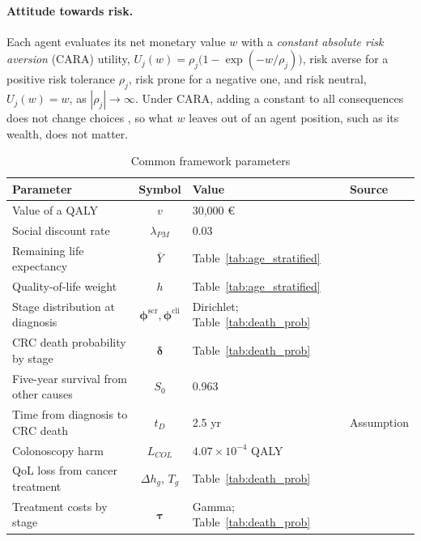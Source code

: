 \documentclass[12pt]{article}
\begin{document}
\paragraph{Attitude towards risk.} Each agent evaluates its net monetary value $w$ with a \emph{constant absolute risk aversion} (CARA) utility, $U_j(w) = \rho_j\big(1 - \exp(-w/\rho_j)\big)$, risk averse for a positive risk tolerance $\rho_j$, risk prone for a negative one, and risk neutral, $U_j(w) = w$, as $|\rho_j| \to \infty$. Under CARA, adding a constant to all consequences does not change choices \citep{pratt1978risk}, so what $w$ leaves out of an agent position, such as its wealth, does not matter.




\begin{table}[htbp]
\centering
\footnotesize
\caption{Common framework parameters}
\label{tab:theta}
\begin{tabular}{l c l l}
\toprule
\textbf{Parameter} & \textbf{Symbol} & \textbf{Value} & \textbf{Source} \\
\midrule
Value of a QALY & $v$ & 30{,}000 € & \citealp{vallejo2018estimating} \\
Social discount rate & $\lambda_{PM}$ & 0.03 & \citealp{lopez2010spanish} \\
Remaining life expectancy & $\bar Y$ & Table~\ref{tab:age_stratified} & \citealp{ine2024mortalidad} \\
Quality-of-life weight & $h$ & Table~\ref{tab:age_stratified} & \citealp{garcia2016normative} \\
Stage distribution at diagnosis & $\boldsymbol{\phi}^{\text{scr}}, \boldsymbol{\phi}^{\text{cli}}$ & Dirichlet; Table~\ref{tab:death_prob} & \citealp{cardoso2022overall} \\
CRC death probability by stage & $\boldsymbol{\delta}$ & Table~\ref{tab:death_prob} & \citealp{cardoso2022overall} \\
Five-year survival from other causes & $S_0$ & 0.963 & \citealp{ine2024mortalidad} \\
Time from diagnosis to CRC death & $t_D$ & 2.5 yr & Assumption\footnotemark \\
Colonoscopy harm & $L_{COL}$ & $4.07\times10^{-4}$ QALY & \citealp{reumkens2016post} \\
QoL loss from cancer treatment & $\Delta h_g$, $T_g$ & Table~\ref{tab:death_prob} & \citealp{djalalov2014review} \\
Treatment costs by stage & $\boldsymbol{\tau}$ & Gamma; Table~\ref{tab:death_prob} & \citealp{corral2015estimation} \\
\bottomrule
\end{tabular}
\end{table}
\end{document}
